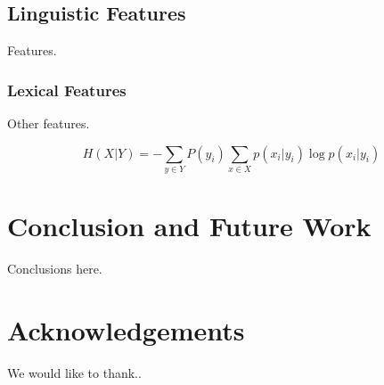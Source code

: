 \documentclass{cys}
\begin{document}
\subsection{Linguistic Features}
\label{subsection:linguistic}

Features. 

\subsubsection{Lexical Features}
\label{subsection:lexicalFeatures}

Other features.

\begin{equation}
H(X|Y) = - \sum_{y \in Y} P(y_i) \sum_{x \in X} p(x_i|y_i)\log p(x_i|y_i)
\label{equation:conditionalEntropy1}
\end{equation}


\section{Conclusion and Future Work}
\label{sec:conclusionAndFutureWork}

Conclusions here.

\section{Acknowledgements} 
We would like to thank.. 



\small{


}
\normalsize
\end{document}
